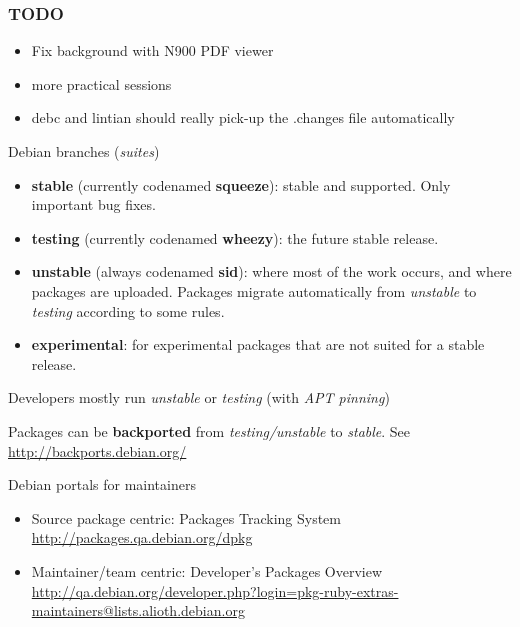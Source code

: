 \documentclass[10pt,final]{beamer}
\begin{document}
\backupbegin

\begin{frame}
	\frametitle{TODO}
\begin{itemize}
\item Fix background with N900 PDF viewer
\item more practical sessions
\item debc and lintian should really pick-up the .changes file automatically
\end{itemize}
\end{frame}

\begin{frame}{Debian branches (\textsl{suites})}
		\begin{itemize}
			\item \textbf{stable} (currently codenamed \textbf{squeeze}): stable and supported. Only important bug fixes.
			\br
			\item \textbf{testing} (currently codenamed \textbf{wheezy}): the future stable release.
			\br
			\item \textbf{unstable} (always codenamed \textbf{sid}): where most of the work occurs, and where packages are uploaded. Packages migrate automatically from \textsl{unstable} to \textsl{testing} according to some rules.
			\br
			\item \textbf{experimental}: for experimental packages that are not suited for a stable release.
		\end{itemize}
		\hbr
		Developers mostly run \textsl{unstable} or \textsl{testing} (with \textsl{APT pinning})
		\hbr

		Packages can be \textbf{backported} from \textsl{testing/unstable} to \textsl{stable}. See \url{http://backports.debian.org/}
\end{frame}

\begin{frame}{Debian portals for maintainers}
		\begin{itemize}
			\item Source package centric: Packages Tracking System\\
			\url{http://packages.qa.debian.org/dpkg}
			\br
			\item Maintainer/team centric: Developer's Packages Overview\\
			\url{http://qa.debian.org/developer.php?login=pkg-ruby-extras-maintainers@lists.alioth.debian.org}
		\end{itemize}
\end{frame}

\backupend
\end{document}
